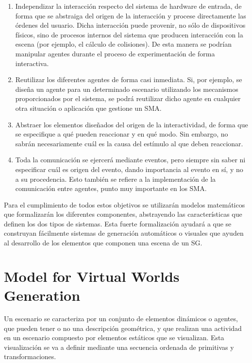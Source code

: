 \documentclass[runningheads]{llncs}
\begin{document}
\begin{enumerate}
    \item Independizar la interacción respecto del sistema de hardware de entrada, de forma que se abstraiga del origen de la interacción y procese directamente las órdenes del usuario. Dicha interacción puede provenir, no sólo de dispositivos físicos, sino de procesos internos del sistema que producen interacción con la escena (por ejemplo, el cálculo de colisiones). De esta manera se podrían manipular agentes durante el proceso de experimentación de forma interactiva.

    \item Reutilizar los diferentes agentes de forma casi inmediata. Si, por ejemplo, se diseña un agente para un determinado escenario utilizando los mecanismos proporcionados por el sistema, se podrá reutilizar dicho agente en cualquier otra situación o aplicación que gestione un SMA.

    \item Abstraer los elementos diseñados del origen de la interactividad, de forma que se especifique a qué pueden reaccionar y en qué modo. Sin embargo, no sabrán necesariamente cuál es la causa del estímulo al que deben reaccionar.

    \item Toda la comunicación se ejercerá mediante eventos, pero siempre sin saber ni especificar cuál es origen del evento, dando importancia al evento en sí, y no a su procedencia. Esto también se refiere a la implementación de la comunicación entre agentes, punto muy importante en los SMA.
    
\end{enumerate}

Para el cumplimiento de todos estos objetivos se utilizarán modelos matemáticos que formalizarán los diferentes componentes, abstrayendo las características que definen los dos tipos de sistemas. Esta fuerte formalización ayudará a que se construyan fácilmente sistemas de generación automáticos o visuales que ayuden al desarrollo de los elementos que componen una escena de un SG.


\section{Model for Virtual Worlds Generation
\label{sec:model}}

Un escenario se caracteriza por un conjunto de elementos dinámicos o agentes, que pueden tener o no una descripción geométrica, y que realizan una actividad en un escenario compuesto por elementos estáticos que se visualizan. Esta visualización se va a definir mediante una secuencia ordenada de primitivas y transformaciones.
\end{document}
